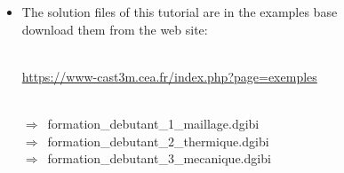 \label{complements}

\begin{frame}{}
  \begin{itemize}
    \item {}
             {The solution files of this tutorial are in the examples base\\
              download them from the web site:}\\~\\
    \begin{center}
      \url{https://www-cast3m.cea.fr/index.php?page=exemples}\\~\\
    \end{center}
    $\Rightarrow$~formation\_debutant\_1\_maillage.dgibi\\
    $\Rightarrow$~formation\_debutant\_2\_thermique.dgibi\\
    $\Rightarrow$~formation\_debutant\_3\_mecanique.dgibi
  \end{itemize}
\end{frame}

